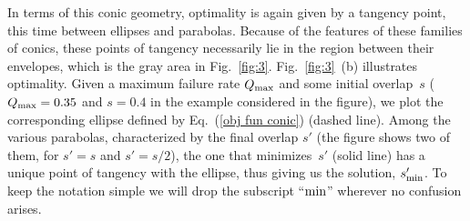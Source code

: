 \documentclass[aps,pra,twocolumn,showpacs]{revtex4-1}
\begin{document}
{In terms of this conic geometry,  optimality is again given by a tangency point, this time between ellipses and parabolas. Because of the features of these families of conics, these points of tangency necessarily lie in the region between their envelopes,  which is the gray area in Fig.~\ref{fig:3}. Fig.~\ref{fig:3}~(b) illustrates optimality. Given a maximum failure rate $Q_{\rm max}$ and some initial overlap~$s$ ($Q_{\rm max}=0.35$ and $s=0.4$ in the example considered in the figure), we plot the corresponding ellipse defined by Eq.~(\ref{obj fun conic}) (dashed line). Among the various parabolas, characterized by the final overlap $s'$ (the figure shows two of them, for $s'=s$ and $s'=s/2$), the one that minimizes~$s'$ (solid line) has a unique point of tangency with the ellipse, thus giving us the solution, $s'_{\rm min}$.  To keep the notation simple we will drop the subscript ``$\rm min$'' wherever no confusion arises. 

}
\end{document}
